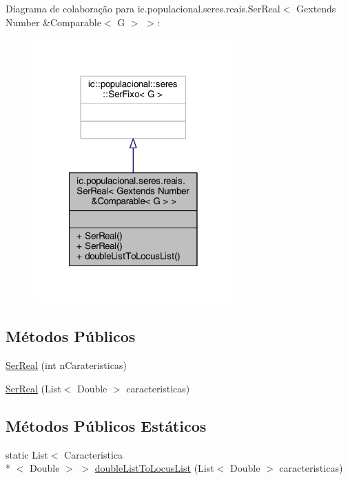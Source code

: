 Diagrama de colaboração para ic.\-populacional.\-seres.\-reais.\-Ser\-Real$<$ Gextends Number \&Comparable$<$ G $>$ $>$\-:
\nopagebreak
\begin{figure}[H]
\begin{center}
\leavevmode
\includegraphics[width=218pt]{classic_1_1populacional_1_1seres_1_1reais_1_1_ser_real_3_01_gextends_01_number_01_6_comparable_3_01_g_01_4_01_4__coll__graph}
\end{center}
\end{figure}
\subsection*{Métodos Públicos}
\begin{DoxyCompactItemize}
\item 
\hyperlink{classic_1_1populacional_1_1seres_1_1reais_1_1_ser_real_3_01_gextends_01_number_01_6_comparable_3_01_g_01_4_01_4_ad4bc50ed5b2105a76400496f1cac7a7b}{Ser\-Real} (int n\-Carateristicas)
\item 
\hyperlink{classic_1_1populacional_1_1seres_1_1reais_1_1_ser_real_3_01_gextends_01_number_01_6_comparable_3_01_g_01_4_01_4_ad46b7553c53c69f1a5b7897a8764c74b}{Ser\-Real} (List$<$ Double $>$ caracteristicas)
\end{DoxyCompactItemize}
\subsection*{Métodos Públicos Estáticos}
\begin{DoxyCompactItemize}
\item 
static List$<$ Caracteristica\\*
$<$ Double $>$ $>$ \hyperlink{classic_1_1populacional_1_1seres_1_1reais_1_1_ser_real_3_01_gextends_01_number_01_6_comparable_3_01_g_01_4_01_4_a32633bd064a00981e82f0ddaf8569408}{double\-List\-To\-Locus\-List} (List$<$ Double $>$ caracteristicas)
\end{DoxyCompactItemize}


